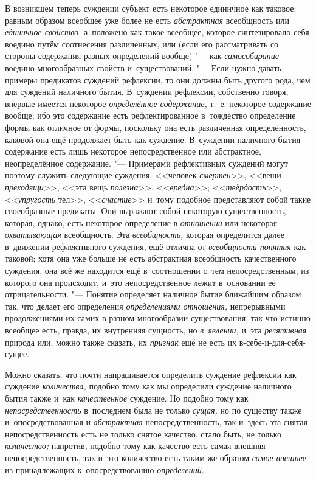 В возникшем теперь суждении субъект есть некоторое единичное как таковое;
равным образом всеобщее уже более не есть {\em абстрактная} всеобщность или
{\em единичное свойство,} а~положено как такое всеобщее, которое синтезировало
себя воедино путём соотнесения различенных, или (если его рассматривать со
стороны содержания разных определений вообще) "--- как {\em самособирание}
воедино многообразных свойств и~существований. "--- Если нужно давать примеры
предикатов суждений рефлексии, то они должны быть другого рода, чем для
суждений наличного бытия. В~суждении рефлексии, собственно говоря, впервые
имеется некоторое {\em определённое содержание,}
т.~е. некоторое содержание вообще; ибо это содержание есть
рефлектированное в~тождество определение формы как отличное от формы,
поскольку она есть различенная определённость, каковой она ещё продолжает
быть как суждение. В~суждении наличного бытия содержание есть лишь
некоторое непосредственное или абстрактное, неопределённое содержание. "---
Примерами рефлективных суждений могут поэтому служить следующие суждения:
<<человек {\em смертен}>>, <<вещи {\em преходящи}>>, <<эта вещь
{\em полезна}>>, <<{\em вредна}>>; <<{\em твёрдость}>>, <<{\em упругость}
тел>>, <<{\em счастие}>> и~тому подобное представляют собой такие своеобразные
предикаты. Они выражают собой некоторую существенность, которая, однако, есть
некоторое определение в {\em отношении} или некоторая {\em охватывающая}
всеобщность. Эта {\em всеобщность,} которая определится далее в~движении
рефлективного суждения, ещё отлична от {\em всеобщности понятия} как таковой;
хотя она уже больше не есть абстрактная всеобщность качественного суждения, она
всё же находится ещё в~соотношении с~тем непосредственным, из которого она
происходит, и~это непосредственное лежит в~основании её отрицательности. "---
Понятие определяет наличное бытие ближайшим образом так, что делает его
определения {\em определениями отношения,} непрерывными продолжениями их самих
в разном многообразии существования, так что истинно всеобщее есть, правда, их
внутренняя сущность, но {\em в~явлении,} и~эта {\em релятивная} природа или,
можно также сказать, их {\em признак} ещё не есть их в-себе-и-для-себя-сущее.

Можно сказать, что почти напрашивается определить суждение рефлексии как
суждение {\em количества,} подобно тому как мы определили суждение наличного
бытия также и~как {\em качественное} суждение. Но подобно тому как
{\em непосредственность} в~последнем была не только {\em сущая,} но по существу
также и~опосредствованная и {\em абстрактная} непосредственность, так и~здесь
эта снятая непосредственность есть не только снятое качество, стало быть, не
только {\em количество;} напротив, подобно тому как качество есть самая внешняя
непосредственность, так и~это количество есть таким же образом
{\em самое внешнее} из принадлежащих к~опосредствованию {\em определений}.

